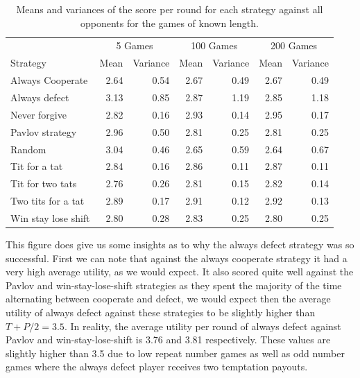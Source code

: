 \documentclass[a4paper]{article}
\begin{document}
\begin{table}[h]
    \centering
\begin{tabular}{lrrrrrr}
                    & \multicolumn{2}{c}{5 Games}   & \multicolumn{2}{c}{100 Games}  & \multicolumn{2}{c}{200 Games} \\
Strategy            & Mean & Variance & Mean & Variance & Mean & Variance \\ \hline
Always Cooperate    & 2.64        & 0.54    & 2.67   & 0.49      & 2.67   & 0.49    \\
Always defect       & 3.13        & 0.85    & 2.87   & 1.19      & 2.85   & 1.18    \\
Never forgive       & 2.82        & 0.16    & 2.93   & 0.14      & 2.95   & 0.17    \\
Pavlov strategy     & 2.96        & 0.50    & 2.81   & 0.25      & 2.81   & 0.25    \\
Random              & 3.04        & 0.46    & 2.65   & 0.59      & 2.64   & 0.67    \\
Tit for a tat       & 2.84        & 0.16    & 2.86   & 0.11      & 2.87   & 0.11    \\
Tit for two tats    & 2.76        & 0.26    & 2.81   & 0.15      & 2.82   & 0.14    \\
Two tits for a tat  & 2.89        & 0.17    & 2.91   & 0.12      & 2.92   & 0.13    \\
Win stay lose shift & 2.80        & 0.28    & 2.83   & 0.25      & 2.80   & 0.25                        
\end{tabular}
    \caption{Means and variances of the score per round for each strategy against all opponents for the games of known length.}
    \label{tab:trialresults}
\end{table}

This figure does give us some insights as to why the always defect strategy was so successful.  First we can note that against the always cooperate strategy it had a very high average utility, as we would expect. It also scored quite well against the Pavlov and win-stay-lose-shift strategies as they spent the majority of the time alternating between cooperate and defect, we would expect then the average utility of always defect against these strategies to be slightly higher than $T+P / 2 = 3.5$. In reality, the average utility per round of always defect against Pavlov and win-stay-lose-shift is 3.76 and 3.81 respectively.  These values are slightly higher than 3.5 due to low repeat number games as well as odd number games where the always defect player receives two temptation payouts.
\end{document}
